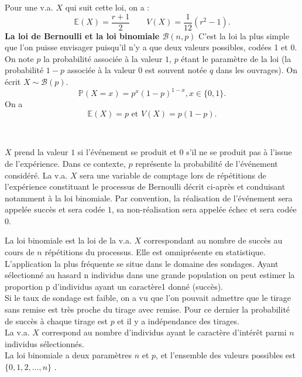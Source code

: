 \documentclass[../PolyS4.tex]{subfiles}
\begin{document}
Pour une v.a. $X$ qui suit cette loi, on a :
$$\mathbb{E}(X) =\dfrac{r + 1}{2} \qquad 
V (X) =\dfrac{1}{12}(r^2 - 1) .$$
\textbf{ La loi de Bernoulli et la loi binomiale $\mathcal{B}(n,p)$}
C'est la loi la plus simple que l'on puisse envisager puisqu'il n'y a que deux valeurs possibles, codées 1 et 0.\\
 On note $p$ la probabilité associée à la valeur $1$, $p$ étant le paramètre de la loi (la probabilité $1-p$ associée à la valeur $0$ est souvent notée $q$ dans les ouvrages). On
écrit $X \sim \mathcal{B}(p)$.\\
$$\mathbb{P}(X = x) = p^x(1 - p)^{1-x} , x \in \{0, 1\}.$$
On a $$\mathbb{E}(X) = p \text{ et } V (X) = p(1 - p).$$

\begin{Rmq}$\,$

$X$ prend la valeur $1$ si l'événement se produit et $0$ s'il ne se produit pas à l'issue de l'expérience. Dans ce contexte, $p$ représente la probabilité de l'événement considéré. La v.a. $X$ sera une variable de comptage lors de répétitions de l'expérience constituant le processus de Bernoulli décrit ci-après et conduisant notamment à la loi binomiale. Par convention, la réalisation de l'événement sera appelée \og succès\fg{}  et sera codée $1$, sa non-réalisation sera appelée \og échec\fg{}  et sera codée $0$.
\end{Rmq}


La loi binomiale est la loi de la v.a. $X$ correspondant au nombre de succès au cours de $n$ répétitions du processus. Elle est omniprésente en statistique.
L'application la plus fréquente se situe dans le domaine des sondages. Ayant
sélectionné au hasard n individus dans une grande population  on peut \og estimer\fg{}  la proportion p d'individus ayant un caractère1 donné (succès).\\
 Si le taux de sondage est faible, on a vu que l'on pouvait admettre que le tirage sans remise est très proche du tirage avec remise. Pour ce dernier la probabilité de succès à chaque tirage est $p$
et il y a indépendance des tirages.\\
 La v.a. $X$ correspond au nombre d'individus ayant le caractère d'intérêt parmi $n$ individus sélectionnés.\\
La loi binomiale a deux paramètres $n$ et $p$, et l'ensemble des valeurs possibles
est $\{0, 1, 2,\dots, n\}$ . \\
\end{document}
